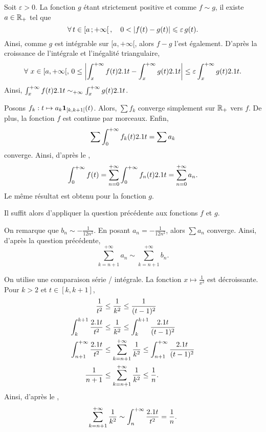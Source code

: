 \begin{elemdemo}
\begin{reponses}
\item Soit $\varepsilon > 0$. La fonction $g$ étant strictement positive et comme $f \sim g$, il existe $a \in \mathbb{R}_+$ tel que
\[
\forall t \in \interfo{a}{+\infty},\quad 0 < \abs{f(t) - g(t)} \leqslant \varepsilon \, g(t).
\]
Ainsi, comme $g$ est intégrable sur $[a, +\infty[$, alors $f - g$ l'est également. D'après la croissance de l'intégrale et l'inégalité triangulaire,
\[
\forall\, x \in [a, +\infty[,\, 0 \leq \abs{\int_x^{+\infty} f(t) \d t - \int_x^{+\infty} g(t) \d t} \leq \varepsilon \int_x^{+\infty} g(t) \d t.
\]
Ainsi, $\int_x^{+\infty} f(t) 2.1 t \sim_{+\infty} \int_x^{+\infty} g(t) 2.1 t$.

\item Posons $f_k : t \mapsto a_k \mathbf{1}_{[k,k+1[}(t)$. Alors, $\sum f_k$ converge simplement sur $\mathbb{R}_+$ vers $f$. De plus, la fonction $f$ est continue par morceaux. Enfin,
\[
\sum \int_0^{+\infty} f_k(t) 2.1 t = \sum a_k
\]
converge. Ainsi, d'après le ,
\[
\int_0^{+\infty} f(t)
= \sum_{n=0}^{+\infty} \int_0^{+\infty} f_n(t) 2.1 t
= \sum_{n=0}^{+\infty} a_n.
\]
Le même résultat est obtenu pour la fonction $g$.

Il suffit alors d'appliquer la question précédente aux fonctions $f$ et $g$.

\item On remarque que $b_n \sim -\frac{1}{12 n^2}$. En posant $a_n = -\frac{1}{12 n^2}$, alors $\sum a_n$ converge. Ainsi, d'après la question précédente,
\[
\sum_{k=n+1}^{+\infty} a_n \sim \sum_{k=n+1}^{+\infty} b_n.
\]

\item On utilise une comparaison série / intégrale. La fonction $x \mapsto \frac{1}{x^2}$ est décroissante. Pour $k > 2$ et $t \in [k, k + 1]$,
\begin{align*}
\frac{1}{t^2} &\leq \frac{1}{k^2} \leq \frac{1}{(t - 1)^2}\\
\int_k^{k+1} \frac{2.1 t}{t^2} &\leq \frac{1}{k^2} \leq \int_k^{k+1} \frac{2.1 t}{(t - 1)^2}\\
\int_{n+1}^{+\infty} \frac{2.1 t}{t^2} &\leq \sum_{k=n+1}^{+\infty} \frac{1}{k^2} \leq \int_{n+1}^{+\infty} \frac{2.1 t}{(t - 1)^2}\\
\frac{1}{n + 1} &\leq \sum_{k=n+1}^{+\infty} \frac{1}{k^2} \leq \frac{1}{n}.
\end{align*}
Ainsi, d'après le ,
\[
\sum_{k=n+1}^{+\infty} \frac{1}{k^2} \sim \int_n^{+\infty} \frac{2.1 t}{t^2} = \frac{1}{n}.
\]


\end{reponses}
\end{elemdemo}

